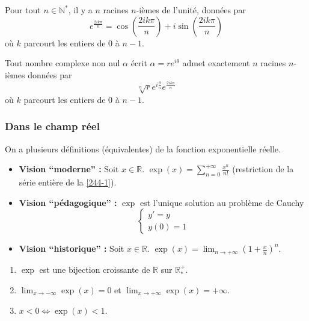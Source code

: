 
  \begin{application}
    Pour tout $n \in \mathbb{N}^*$, il y a $n$ racines $n$-ièmes de l'unité, données par
    \[ e^{\frac{2ik\pi}{n}} = \cos \left( \frac{2ik\pi}{n} \right) + i \sin \left( \frac{2ik\pi}{n} \right) \]
    où $k$ parcourt les entiers de $0$ à $n-1$.
  \end{application}

  \begin{corollary}
    Tout nombre complexe non nul $\alpha$ écrit $\alpha = re^{i\theta}$ admet exactement $n$ racines $n$-ièmes données par
    \[ \sqrt[n]{r} e^{i\frac{\theta}{n}} e^{\frac{2ik\pi}{n}} \]
    où $k$ parcourt les entiers de $0$ à $n-1$.
  \end{corollary}

  \subsubsection{Dans le champ réel}


  \begin{definition}
    On a plusieurs définitions (équivalentes) de la fonction exponentielle réelle.
    \begin{itemize}
      \item \textbf{Vision ``moderne'' :} Soit $x \in \mathbb{R}$. $\exp(x) = \sum_{n=0}^{+\infty} \frac{x^n}{n!}$ (restriction de la série entière de la \cref{244-1}).
      \item \textbf{Vision ``pédagogique'' :} $\exp$ est l'unique solution au problème de Cauchy
      \[
        \begin{cases}
          y' = y \\
          y(0) = 1
        \end{cases}
      \]
      \item \textbf{Vision ``historique'' :} Soit $x \in \mathbb{R}$. $\exp(x) = \lim_{n \rightarrow +\infty} \left( 1 + \frac{x}{n} \right)^n$.
    \end{itemize}
  \end{definition}


  \begin{theorem}
    \begin{enumerate}[label={\bfseries(\roman*)}]
      \item $\exp$ est une bijection croissante de $\mathbb{R}$ sur $\mathbb{R}_*^+$.
      \item $\lim_{x \rightarrow -\infty} \exp(x) = 0$ et $\lim_{x \rightarrow +\infty} \exp(x) = +\infty$.
      \item $x < 0 \iff \exp(x) < 1$.
    \end{enumerate}
  \end{theorem}


